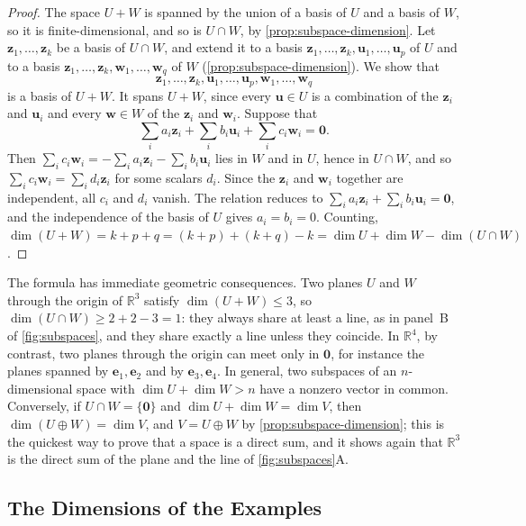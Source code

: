 \begin{proof}
The space $U+W$ is spanned by the union of a basis of $U$ and a basis of $W$, so it is finite-dimensional, and so is $U\cap W$, by \cref{prop:subspace-dimension}. Let $\mathbf z_1,\ldots,\mathbf z_k$ be a basis of $U\cap W$, and extend it to a basis $\mathbf z_1,\ldots,\mathbf z_k,\mathbf u_1,\ldots,\mathbf u_p$ of $U$ and to a basis $\mathbf z_1,\ldots,\mathbf z_k,\mathbf w_1,\ldots,\mathbf w_q$ of $W$ (\cref{prop:subspace-dimension}). We show that
\[
\mathbf z_1,\ldots,\mathbf z_k,\mathbf u_1,\ldots,\mathbf u_p,\mathbf w_1,\ldots,\mathbf w_q
\]
is a basis of $U+W$. It spans $U+W$, since every $\mathbf u\in U$ is a combination of the $\mathbf z_i$ and $\mathbf u_i$ and every $\mathbf w\in W$ of the $\mathbf z_i$ and $\mathbf w_i$. Suppose that
\[
\sum_ia_i\mathbf z_i+\sum_ib_i\mathbf u_i+\sum_ic_i\mathbf w_i=\mathbf 0 .
\]
Then $\sum_ic_i\mathbf w_i=-\sum_ia_i\mathbf z_i-\sum_ib_i\mathbf u_i$ lies in $W$ and in $U$, hence in $U\cap W$, and so $\sum_ic_i\mathbf w_i=\sum_id_i\mathbf z_i$ for some scalars $d_i$. Since the $\mathbf z_i$ and $\mathbf w_i$ together are independent, all $c_i$ and $d_i$ vanish. The relation reduces to $\sum_ia_i\mathbf z_i+\sum_ib_i\mathbf u_i=\mathbf 0$, and the independence of the basis of $U$ gives $a_i=b_i=0$. Counting, $\dim(U+W)=k+p+q=(k+p)+(k+q)-k=\dim U+\dim W-\dim(U\cap W)$.
\end{proof}

The formula has immediate geometric consequences. Two planes $U$ and $W$ through the origin of $\mathbb R^3$ satisfy $\dim(U+W)\le3$, so $\dim(U\cap W)\ge2+2-3=1$: they always share at least a line, as in panel~B of \cref{fig:subspaces}, and they share exactly a line unless they coincide. In $\mathbb R^4$, by contrast, two planes through the origin can meet only in $\mathbf 0$, for instance the planes spanned by $\mathbf e_1,\mathbf e_2$ and by $\mathbf e_3,\mathbf e_4$. In general, two subspaces of an $n$-dimensional space with $\dim U+\dim W>n$ have a nonzero vector in common. Conversely, if $U\cap W=\{\mathbf 0\}$ and $\dim U+\dim W=\dim V$, then $\dim(U\oplus W)=\dim V$, and $V=U\oplus W$ by \cref{prop:subspace-dimension}; this is the quickest way to prove that a space is a direct sum, and it shows again that $\mathbb R^3$ is the direct sum of the plane and the line of \cref{fig:subspaces}A.

\subsection{The Dimensions of the Examples}

